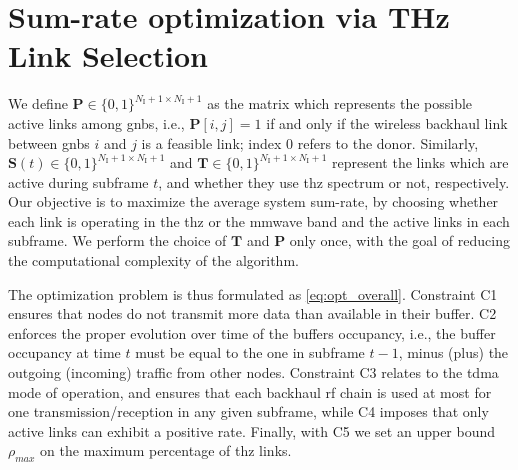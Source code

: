 
\section{Sum-rate optimization via THz Link Selection}
\label{sub:THzLinkSel}

We define $\bm{P} \in \{0, 1\}^{N_{\mathrm{I}} + 1 \times N_{\mathrm{I}} + 1}$ as the matrix which represents the possible active links among \glspl{gnb}, i.e., $\bm{P} [i, j] = 1$ if and only if the wireless backhaul link between \glspl{gnb} $i$ and $j$ is a feasible link; index $0$ refers to the donor. Similarly, $\bm{S} (t) \in \{0, 1\}^{N_{\mathrm{I}} + 1 \times N_{\mathrm{I}} + 1}$ and $\bm{T} \in \{0, 1\}^{N_{\mathrm{I}} + 1 \times N_{\mathrm{I}} + 1}$ represent the links which are active during subframe $t$, and whether they use \gls{thz} spectrum or not, respectively. 
Our objective is to maximize the average system sum-rate, by choosing whether each link is operating in the \gls{thz} or the \gls{mmwave} band and the active links in each subframe. We perform the choice of $\bm{T}$ and $\bm{P}$ only once, with the goal of reducing the computational complexity of the algorithm.



The optimization problem is thus formulated as \eqref{eq:opt_overall}. Constraint C1 ensures that nodes do not transmit more data than available in their buffer. C2 enforces the proper evolution over time of the buffers occupancy, i.e., the buffer occupancy at time $t$ must be equal to the one in subframe $t - 1$, minus (plus) the outgoing (incoming) traffic from other nodes. Constraint C3 relates to the \gls{tdma} mode of operation, and ensures that each backhaul \gls{rf} chain is used at most for one transmission/reception in any given subframe, while C4 imposes that only active links can exhibit a positive rate. 
Finally, with C5 we set an upper bound $\rho_{max}$ on the maximum percentage of \gls{thz} links. 

